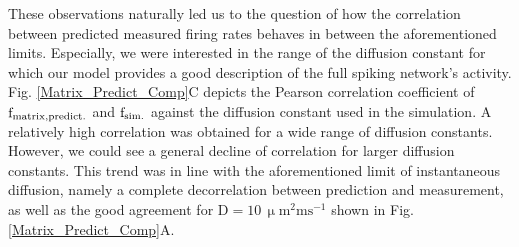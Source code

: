 \documentclass[10pt,letterpaper]{article}
\begin{document}
These observations naturally led us to the question of how the correlation between predicted measured firing rates behaves in between the aforementioned limits. Especially, we were interested in the range of the diffusion constant for which our model provides a good description of the full spiking network's activity. Fig. \ref{Matrix_Predict_Comp}C depicts the Pearson correlation coefficient of $\mathrm{f_{\rm matrix, predict.}}$ and $\mathrm{f_{\rm sim.}}$ against the diffusion constant used in the simulation. A relatively high correlation was obtained for a wide range of diffusion constants. However, we could see a general decline of correlation for larger diffusion constants. This trend was in line with the aforementioned limit of instantaneous diffusion, namely a complete decorrelation between prediction and measurement, as well as the good agreement for $\mathrm{D= 10\, \upmu m^2 ms^{-1}}$ shown in Fig. \ref{Matrix_Predict_Comp}A.
\end{document}
